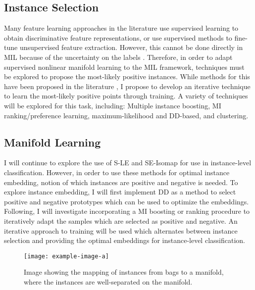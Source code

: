 \subsection{Instance Selection}
Many feature learning approaches in the literature use supervised learning to obtain discriminative feature representations, or use supervised methods to fine-tune unsupervised  feature extraction.  However, this cannot be done directly in MIL because of the uncertainty on the labels \citep{Carbonneau2016MILSurvey}.  Therefore, in order to adapt supervised nonlinear manifold learning to the MIL framework, techniques must be explored to propose the most-likely positive instances.  While methods for this have been proposed in the literature \citep{Kim2010LocalDRMIL, Maron1998DiverseDensity, Bocinsky2019SPIEMIACEInitialization}, I propose to develop an iterative technique to learn the most-likely positive points through training.  A variety of techniques will be explored for this task, including: Multiple instance boosting, MI ranking/preference learning, maximum-likelihood and DD-based, and clustering.  

\subsection{Manifold Learning}
I will continue to explore the use of S-LE and SE-Isomap for use in instance-level classification.  However, in order to use these methods for optimal instance embedding, notion of which instances are positive and negative is needed.  To explore instance  embedding, I will first implement DD as a method to select positive and negative prototypes which can be used to optimize the embeddings.  Following, I will investigate incorporating a MI boosting or ranking procedure to iteratively adapt the samples which are selected as positive and negative.  An iterative approach to training will be used which alternates between instance selection and providing the optimal embeddings for instance-level classification.

\begin{center}
	\begin{figure*}[h]
		\centering
		\texttt{[image: example-image-a]}
		\caption[Proposed Manifold Learning]{Image showing the mapping of instances from bags to a manifold, where the instances are well-separated  on the manifold.}
		\label{fig:proposed_manifold_learning}
	\end{figure*}
\end{center}

